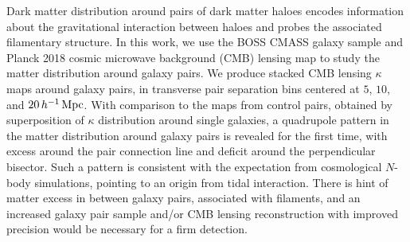 
Dark matter distribution around pairs of dark matter haloes encodes 
information about the gravitational interaction between haloes and 
probes the associated filamentary structure. In this work, we use 
the BOSS CMASS galaxy sample and Planck 2018 cosmic microwave 
background (CMB) lensing map to study the matter distribution 
around galaxy pairs. We produce stacked CMB lensing $\kappa$ maps 
around galaxy pairs, in transverse pair separation bins centered
at $5$, $10$, and $20\,h^{-1}\,{\rm Mpc}$. With comparison to the maps 
from control pairs, obtained by superposition of $\kappa$ 
distribution around single galaxies, a quadrupole pattern 
in the matter distribution around galaxy pairs is revealed 
for the first time, with excess around the pair connection 
line and deficit around the perpendicular bisector. Such a 
pattern is consistent with the expectation from cosmological 
$N$-body simulations, pointing to an origin from tidal interaction. 
There is hint of matter excess in between galaxy pairs, 
associated with filaments, and an increased galaxy pair 
sample and/or CMB lensing reconstruction with improved 
precision would be necessary for a firm detection.
